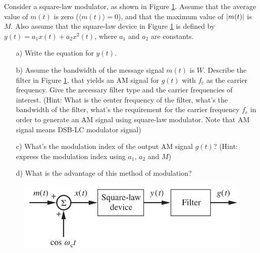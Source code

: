 \documentclass{assignment}
\begin{document}
\begin{prob}
    Consider a square-law modulator, as shown in Figure \ref{Assignment-4-Problem-4}. Assume that the average value of $m(t)$ is zero ($\langle m(t)\rangle=0$), and that the maximum value of $\left\lvert m(t)\right\rvert$ is $M$. Also assume that the square-law device in Figure \ref{Assignment-4-Problem-4} is defined by $y(t)=a_1x(t)+a_2x^2(t)$, where $a_1$ and $a_2$ are constants.
    \begin{itemize}
        \item[a)] Write the equation for $y(t)$.
        \item[b)] Assume the bandwidth of the message signal $m(t)$ is $W$. Describe the filter in Figure \ref{Assignment-4-Problem-4}, that yields an AM signal for $g(t)$ with $f_c$ as the carrier frequency. Give the necessary filter type and the carrier frequencies of interest. (Hint: What is the center frequency of the filter, what's the bandwidth of the filter, what's the requirement for the carrier frequency $f_c$ in order to generate an AM signal using square-law modulator. Note that AM signal means DSB-LC modulator signal)
        \item[c)] What's the modulation index of the output AM signal $g(t)$? (Hint: express the modulation index using $a_1$, $a_2$ and $M$)
        \item[d)] What is the advantage of this method of modulation?
    \end{itemize}
    \begin{figure}[h]
        \centering
        \includegraphics[width=.5\columnwidth]{Assignment-4-Problem-4.jpg}
        \caption{}
        \label{Assignment-4-Problem-4}
    \end{figure}
\end{prob}
\end{document}
